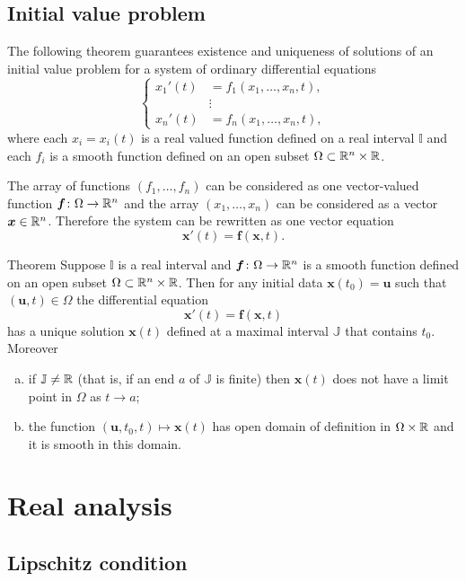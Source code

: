 \subsection*{Initial value problem}

The following theorem guarantees existence and uniqueness of solutions of an initial value problem
for a system of ordinary differential equations
\[
\begin{cases}
x_1'(t)&=f_1(x_1,\dots,x_n,t),
\\
&\vdots
\\
x_n'(t)&=f_n(x_1,\dots,x_n,t),
\end{cases}
\]
where each $x_i=x_i(t)$ is a real valued function defined on a real interval $\mathbb{I}$
and each $f_i$ is a smooth function defined on an open subset $\Omega\subset \mathbb{R}^n\times \mathbb{R}$.

The array of functions $(f_1,\dots,f_n)$ can be considered as one vector-valued function 
$\bm{f}\colon\Omega\to \mathbb{R}^n$ and the array $(x_1,\dots,x_n)$ can be considered as a vector  $\bm{x}\in\mathbb{R}^n$.
Therefore the system can be rewritten as one vector equation 
\[\bm{x}'(t)=\bm{f}(\bm{x}, t).\] 

\begin{thm}{Theorem}\label{thm:ODE}
Suppose $\mathbb{I}$ is a real interval and $\bm{f}\colon\Omega\to \mathbb{R}^n$ is a smooth function defined on an open subset $\Omega\subset \mathbb{R}^n\times \mathbb{R}$.
Then for any initial data $\bm{x}(t_0)=\bm{u}$ such that $(\bm{u},t)\in\Omega$ the differential equation 
\[\bm{x}'(t)=\bm{f}(\bm{x},t)\]
has a unique solution $\bm{x}(t)$ defined at a maximal interval $\mathbb{J}$ that contains $t_0$.
Moreover
\begin{enumerate}[(a)]
\item  if $\mathbb{J}\ne \mathbb{R}$ (that is, if an end $a$ of $\mathbb{J}$ is finite) then $\bm{x}(t)$ does not have a limit point in $\Omega$ as $t\to a$;
\item  the function $(\bm{u},t_0,t)\mapsto \bm{x}(t)$ has open domain of definition in $\Omega\times \mathbb{R}$ and it is smooth in this domain.
\end{enumerate}


\end{thm}

\section{Real analysis}

\subsection*{Lipschitz condition}

